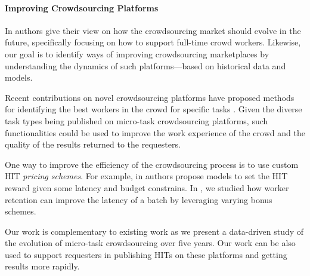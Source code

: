 
\paragraph{Improving Crowdsourcing Platforms}
In \cite{Kittur:2013:FCW:2441776.2441923} authors give their view on how the crowdsourcing market should evolve in the future, specifically focusing on how to support full-time crowd workers. 
Likewise, our goal is to identify ways of improving crowdsourcing marketplaces by understanding the dynamics of such platforms---based on historical data and models.

Recent contributions on novel crowdsourcing platforms have proposed methods for identifying the best workers in the crowd for specific tasks \cite{pickacrowd,bozzon}. Given the diverse task types being published on micro-task crowdsourcing platforms, such functionalities could be used to improve the work experience of the crowd and the quality of the results returned to the requesters.

One way to improve the efficiency of the crowdsourcing process is to use custom HIT \emph{pricing schemes}. For example, in \cite{finishthem} authors propose models to set the HIT reward given some latency and budget constrains. In \cite{scaleup}, we studied how worker retention can improve the latency of a batch by leveraging varying bonus schemes.

Our work is complementary to existing work as we present a data-driven study of the evolution of micro-task crowdsourcing over five years.
Our work can be also used to support requesters in publishing HITs on these platforms and getting results more rapidly.




